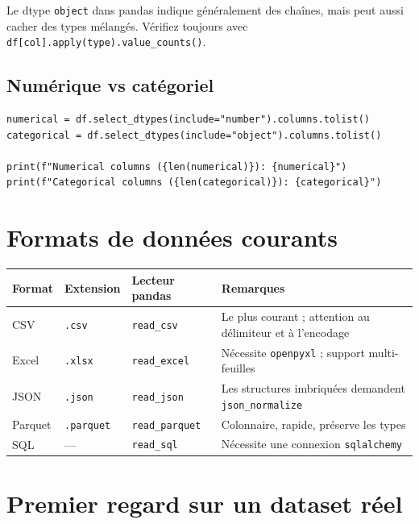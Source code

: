 \begin{preprocesstip}
Le dtype \texttt{object} dans pandas indique g\'en\'eralement des cha\^ines, mais peut aussi cacher des types m\'elang\'es. V\'erifiez toujours avec \texttt{df[col].apply(type).value\_counts()}.
\end{preprocesstip}

\subsection{Num\'erique vs cat\'egoriel}

\begin{verbatim}
numerical = df.select_dtypes(include="number").columns.tolist()
categorical = df.select_dtypes(include="object").columns.tolist()

print(f"Numerical columns ({len(numerical)}): {numerical}")
print(f"Categorical columns ({len(categorical)}): {categorical}")
\end{verbatim}

\section{Formats de donn\'ees courants}

\begin{longtable}{lllp{5cm}}
\toprule
\textbf{Format} & \textbf{Extension} & \textbf{Lecteur pandas} & \textbf{Remarques} \\
\midrule
CSV & \texttt{.csv} & \texttt{read\_csv} & Le plus courant ; attention au d\'elimiteur et \`a l'encodage \\
Excel & \texttt{.xlsx} & \texttt{read\_excel} & N\'ecessite \texttt{openpyxl} ; support multi-feuilles \\
JSON & \texttt{.json} & \texttt{read\_json} & Les structures imbriqu\'ees demandent \texttt{json\_normalize} \\
Parquet & \texttt{.parquet} & \texttt{read\_parquet} & Colonnaire, rapide, pr\'eserve les types \\
SQL & --- & \texttt{read\_sql} & N\'ecessite une connexion \texttt{sqlalchemy} \\
\bottomrule
\end{longtable}

\section{Premier regard sur un dataset r\'eel}

